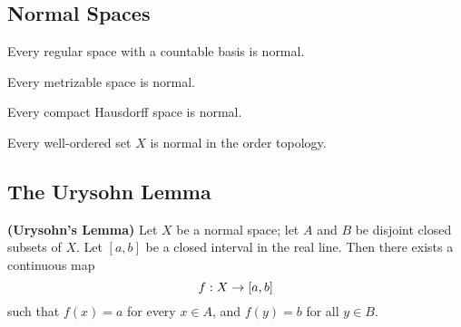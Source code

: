 \subsection{Normal Spaces}\nl
\setcounter{section}{32}
\setcounter{thm}{0}

\vs

\begin{thm}
Every regular space with a countable basis is normal.
\end{thm}

\vs

\begin{thm}
Every metrizable space is normal.
\end{thm}

\vs

\begin{thm}
Every compact Hausdorff space is normal.
\end{thm}

\vs

\begin{thm}
Every well-ordered set $X$ is normal in the order topology.
\end{thm}



\subsection{The Urysohn Lemma}\nl
\setcounter{section}{33}
\setcounter{thm}{0}


\begin{thm}\textbf{(Urysohn's Lemma)}
Let $X$ be a normal space; let $A$ and $B$ be disjoint closed subsets of $X$. Let $[a,b]$ be a closed interval in the real line. Then there exists a continuous map
\[f: X\rightarrow [a,b]\]
such that $f(x) = a$ for every $x\in A$, and $f(y) = b$ for all $y\in B$.
\end{thm}

























